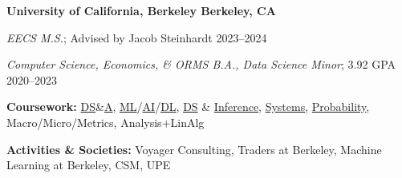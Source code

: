 \textbf{University of California, Berkeley \hfill Berkeley, CA} \par
\textit{EECS M.S.}; Advised by Jacob Steinhardt \hfill 2023--2024\par
\textit{Computer Science, Economics, \& ORMS B.A., Data Science Minor}; 3.92 GPA \hfill 2020--2023\par
\textbf{Coursework:} \href{https://sp23.datastructur.es/}{DS}\&\href{https://cs170.org/}{A}, \href{https://www.eecs189.org/}{ML}/\href{https://inst.eecs.berkeley.edu/~cs188/fa22/}{AI}/\href{https://inst.eecs.berkeley.edu/~cs182/sp23/}{DL}, \href{https://ds100.org/}{DS} \& \href{https://data102.org/fa22/}{Inference}, \href{https://inst.eecs.berkeley.edu/~cs61c/fa22/}{Systems}, \href{https://www.stat134.org/}{Probability}, Macro/Micro/Metrics, Analysis+LinAlg \par
\textbf{Activities \& Societies:} Voyager Consulting, Traders at Berkeley, Machine Learning at Berkeley, CSM, UPE